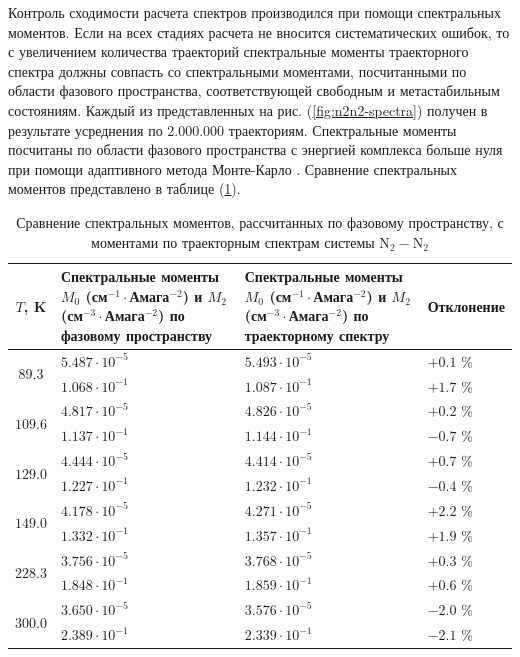 Контроль сходимости расчета спектров производился при помощи спектральных моментов. Если на всех стадиях расчета не вносится систематических ошибок, то с увеличением количества траекторий спектральные моменты траекторного спектра должны совпасть со спектральными моментами, посчитанными по области фазового пространства, соответствующей свободным и метастабильным состояниям. Каждый из представленных на рис. (\ref{fig:n2n2-spectra}) получен в результате усреднения по 2.000.000 траекториям. Спектральные моменты посчитаны по области фазового пространства с энергией комплекса больше нуля при помощи адаптивного метода Монте-Карло \cite{hep}. Сравнение спектральных моментов представлено в таблице (\ref{table:n2n2-moments}).

\begin{table}[H]
    \begin{tabular}{c >{\centering}p{6cm} >{\centering}p{6cm} >{\centering}p{3cm}}
        \toprule
        $T$, K & Спектральные моменты $M_0$ (см$^{-1} \cdot$Амага$^{-2}$) и $M_2$ (см$^{-3} \cdot$Амага$^{-2}$) по фазовому пространству & Спектральные моменты $M_0$ (см$^{-1} \cdot$Амага$^{-2}$) и $M_2$ (см$^{-3} \cdot$Амага$^{-2}$) по траекторному спектру & Отклонение \tabularnewline
        \midrule
        \multirow{2}{*}{$89.3$}  & $5.487\cdot 10^{-5}$ & $5.493 \cdot 10^{-5}$ & $+0.1$ \%  \tabularnewline
                                 & $1.068\cdot 10^{-1}$ & $1.087 \cdot 10^{-1}$ & $+1.7$ \%  \tabularnewline
        \midrule
        \multirow{2}{*}{$109.6$} & $4.817\cdot 10^{-5}$ & $4.826 \cdot 10^{-5}$ & $+0.2$ \%  \tabularnewline
                                 & $1.137\cdot 10^{-1}$ & $1.144 \cdot 10^{-1}$ & $-0.7$ \%  \tabularnewline
        \midrule
        \multirow{2}{*}{$129.0$} & $4.444\cdot 10^{-5}$ & $4.414 \cdot 10^{-5}$ & $+0.7$ \%  \tabularnewline
                                 & $1.227\cdot 10^{-1}$ & $1.232 \cdot 10^{-1}$ & $-0.4$ \%  \tabularnewline
        \midrule
        \multirow{2}{*}{$149.0$} & $4.178\cdot 10^{-5}$ & $4.271 \cdot 10^{-5}$ & $+2.2$ \%  \tabularnewline
                                 & $1.332\cdot 10^{-1}$ & $1.357 \cdot 10^{-1}$ & $+1.9$ \%  \tabularnewline
        \midrule
        \multirow{2}{*}{$228.3$} & $3.756\cdot 10^{-5}$ & $3.768 \cdot 10^{-5}$ & $+0.3$ \%  \tabularnewline
                                 & $1.848\cdot 10^{-1}$ & $1.859 \cdot 10^{-1}$ & $+0.6$ \%  \tabularnewline
        \midrule
        \multirow{2}{*}{$300.0$} & $3.650\cdot 10^{-5}$ & $3.576 \cdot 10^{-5}$ & $-2.0$ \%  \tabularnewline
                                 & $2.389\cdot 10^{-1}$ & $2.339 \cdot 10^{-1}$ & $-2.1$ \%  \tabularnewline
        \bottomrule
    \end{tabular}
    \caption{Сравнение спектральных моментов, рассчитанных по фазовому пространству, с моментами по траекторным спектрам системы N$_2-$N$_2$}
    \label{table:n2n2-moments}
\end{table}

